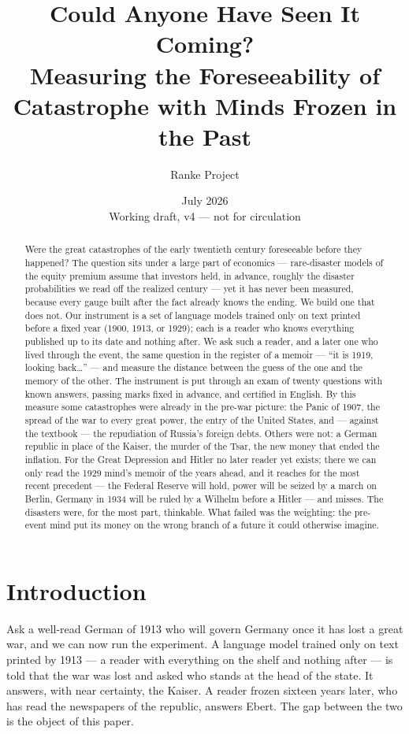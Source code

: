 \documentclass[11pt]{article}
\title{Could Anyone Have Seen It Coming?\\[2pt]
\large Measuring the Foreseeability of Catastrophe with Minds Frozen in the Past}
\author{Ranke Project}
\date{July 2026 \\[4pt] \small Working draft, v4 --- not for circulation}
\begin{document}
\maketitle

\begin{abstract}
\noindent Were the great catastrophes of the early twentieth century foreseeable before they happened?
The question sits under a large part of economics --- rare-disaster models of the equity premium assume
that investors held, in advance, roughly the disaster probabilities we read off the realized century ---
yet it has never been measured, because every gauge built after the fact already knows the ending. We
build one that does not. Our instrument is a set of language models trained only on text printed before
a fixed year (1900, 1913, or 1929); each is a reader who knows everything published up to its date and
nothing after. We ask such a reader, and a later one who lived through the event, the same question in
the register of a memoir --- ``it is 1919, looking back\ldots'' --- and measure the distance between the
guess of the one and the memory of the other. The instrument is put through an exam of twenty questions
with known answers, passing marks fixed in advance, and certified in English. By this measure some
catastrophes were already in the pre-war picture: the Panic of 1907, the spread of the war to every great
power, the entry of the United States, and --- against the textbook --- the repudiation of Russia's
foreign debts. Others were not: a German republic in place of the Kaiser, the murder of the Tsar, the new
money that ended the inflation. For the Great Depression and Hitler no later reader yet exists; there we
can only read the 1929 mind's memoir of the years ahead, and it reaches for the most recent precedent ---
the Federal Reserve will hold, power will be seized by a march on Berlin, Germany in 1934 will be ruled
by a Wilhelm before a Hitler --- and misses. The disasters were, for the most part, thinkable. What failed
was the weighting: the pre-event mind put its money on the wrong branch of a future it could otherwise
imagine.
\end{abstract}

\section{Introduction}\label{sec:intro}

Ask a well-read German of 1913 who will govern Germany once it has lost a great war, and we can now run
the experiment. A language model trained only on text printed by 1913 --- a reader with everything on the
shelf and nothing after --- is told that the war was lost and asked who stands at the head of the state.
It answers, with near certainty, the Kaiser. A reader frozen sixteen years later, who has read the
newspapers of the republic, answers Ebert. The gap between the two is the object of this paper.
\end{document}
